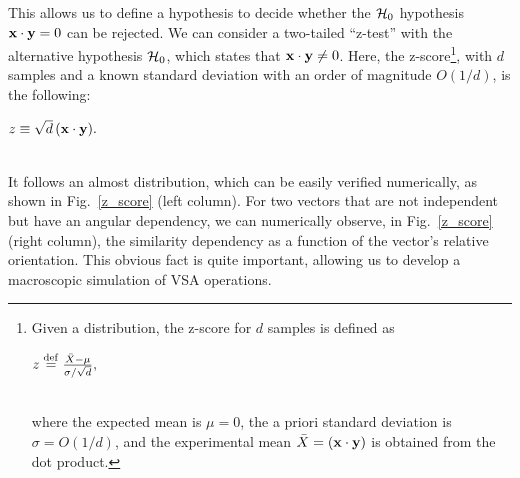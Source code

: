 \documentclass[sn-mathphys]{sn-jnl}
\newcommand{\defq}{\stackrel {\rm def}{=}}
\newcommand{\eqline}[1]{~\vspace{0.1cm}\\\centerline{$#1$}\vspace{0.1cm}\\}
\begin{document}
This allows us to define a hypothesis to decide whether the ${\cal H}_0$ hypothesis ${\bf x} \cdot {\bf y} = 0$ can be rejected. We can consider a two-tailed ``z-test'' with the alternative hypothesis ${\cal H}_0$, which states that ${\bf x} \cdot {\bf y} \neq 0$. Here, the z-score\footnote{Given a distribution, the z-score for $d$ samples is defined as
\eqline{z \defq \frac{\bar{X} - \mu}{\sigma / \sqrt{d}},}
where the expected mean is $\mu = 0$, the a priori standard deviation is $\sigma = O(1/d)$, and the experimental mean $\bar{X} = ({\bf x} \cdot {\bf y})$ is obtained from the dot product.}, with $d$ samples and a known standard deviation with an order of magnitude $O(1/d)$, is the following:
\eqline{z \equiv \sqrt{d} \, ({\bf x} \cdot {\bf y}).}
It follows an almost distribution, which can be easily verified numerically, as shown in Fig.~\ref{z_score} (left column). For two vectors that are not independent but have an angular dependency, we can numerically observe, in Fig.~\ref{z_score} (right column), the similarity dependency as a function of the vector's relative orientation. This obvious fact is quite important, allowing us to develop a macroscopic simulation of VSA operations.
\end{document}
